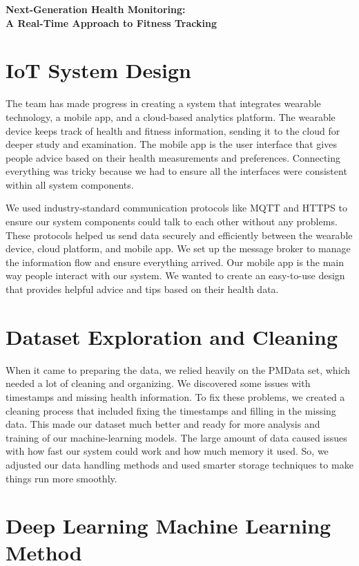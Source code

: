 \documentclass[10pt]{extarticle}
\begin{document}
\begin{center}
    {\LARGE \textbf{Next-Generation Health Monitoring:}} \\
    {\large \textbf{A Real-Time Approach to Fitness Tracking}}
\end{center}


\section{IoT System Design}

The team has made progress in creating a system that integrates wearable technology, a mobile app, and a cloud-based analytics platform. The wearable device keeps track of health and fitness information, sending it to the cloud for deeper study and examination. The mobile app is the user interface that gives people advice based on their health measurements and preferences. Connecting everything was tricky because we had to ensure all the interfaces were consistent within all system components.

We used industry-standard communication protocols like MQTT and HTTPS to ensure our system components could talk to each other without any problems. These protocols helped us send data securely and efficiently between the wearable device, cloud platform, and mobile app. We set up the message broker to manage the information flow and ensure everything arrived. Our mobile app is the main way people interact with our system. We wanted to create an easy-to-use design that provides helpful advice and tips based on their health data.

\section{Dataset Exploration and Cleaning}

When it came to preparing the data, we relied heavily on the PMData set, which needed a lot of cleaning and organizing. We discovered some issues with timestamps and missing health information. To fix these problems, we created a cleaning process that included fixing the timestamps and filling in the missing data. This made our dataset much better and ready for more analysis and training of our machine-learning models. The large amount of data caused issues with how fast our system could work and how much memory it used. So, we adjusted our data handling methods and used smarter storage techniques to make things run more smoothly.

\section{Deep Learning Machine Learning Method}
\end{document}

